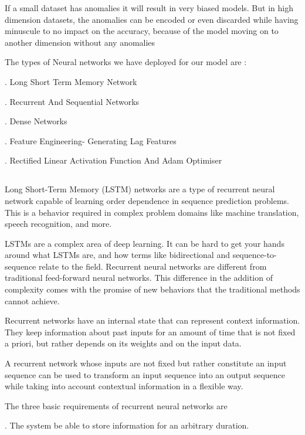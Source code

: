 \documentclass[12pt]{article}
\newcommand{\nd}{\noindent}
\newcommand{\msize}{\fontsize{14pt}{12pt}\selectfont}
\begin{document}
\nd If a small dataset has anomalies it will result in very biased models. But in high dimension datasets, the anomalies can be encoded or even discarded while having minuscule to no impact on the accuracy, because of the model moving on to another dimension without any anomalies 

\nd The types of Neural networks we have deployed for our model are : 

\nd 1. Long Short Term Memory Network 

\nd 2. Recurrent And Sequential Networks 

\nd 3. Dense Networks 

\nd 4. Feature Engineering- Generating Lag Features 

\nd 5. Rectified Linear Activation Function And Adam Optimiser 

\newpage 
\subsection{\msize{\textbf{\textbf{LONG SHORT TERM MEMORY NETWORKS}}}}
Long Short-Term Memory (LSTM) networks are a type of recurrent neural network capable of learning order dependence in sequence prediction problems. This is a behavior required in complex problem domains like machine translation, speech recognition, and more.

\nd LSTMs are a complex area of deep learning. It can be hard to get your hands around what LSTMs are, and how terms like bidirectional and sequence-to-sequence relate to the field. Recurrent neural networks are different from traditional feed-forward neural networks. This difference in the addition of complexity comes with the promise of new behaviors that the traditional methods cannot achieve.

\nd Recurrent networks have an internal state that can represent context information. They keep information about past inputs for an amount of time that is not fixed a priori, but rather depends on its weights and on the input data.

\nd A recurrent network whose inputs are not fixed but rather constitute an input sequence can be used to transform an input sequence into an output sequence while taking into account contextual information in a flexible way.

\nd The three basic requirements of recurrent neural networks are 

\nd 1. The system be able to store information for an arbitrary duration.
\end{document}

